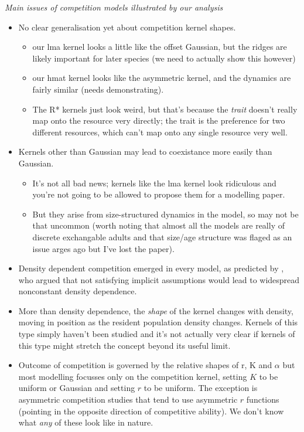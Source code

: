 \documentclass[a4paper,11pt]{article}
\begin{document}
\textit{Main issues of competition models illustrated by our analysis}
\begin{itemize}
\item No clear generalisation yet about competition kernel shapes.
  \begin{itemize}
  \item our lma kernel looks a little like the
    \citet{Roughgarden-1979} offset Gaussian, but the ridges are
    likely important for later species (we need to actually show this
    however)
  \item our hmat kernel looks like the \citet{Kisdi-1999} asymmetric
    kernel, and the dynamics are fairly similar (needs
    demonstrating).
  \item The R* kernels just look weird, but that's because the
    \emph{trait} doesn't really map onto the resource very directly;
    the trait is the preference for two different resources, which
    can't map onto any single resource very well.
  \end{itemize}
\item Kernels other than Gaussian may lead to coexistance more easily
  than Gaussian.  
  \begin{itemize}
  \item It's not all bad news; kernels like the lma kernel look
    ridiculous and you're not going to be allowed to propose them for
    a modelling paper.
  \item But they arise from size-structured dynamics in the model, so
    may not be that uncommon (worth noting that almost all the models
    are really of discrete exchangable adults and that size/age
    structure was flaged as an issue arges ago but I've lost the
    paper).
  \end{itemize}
\item Density dependent competition emerged in every model, as
  predicted by \citet{Abrams-1980}, who argued that not satisfying
  implicit assumptions would lead to widespread nonconstant density
  dependence.
\item More than density dependence, the \emph{shape} of the kernel
  changes with density, moving in position as the resident population
  density changes.  Kernels of this type simply haven't been studied
  and it's not actually very clear if kernels of this type might
  stretch the concept beyond its useful limit.
\item Outcome of competition is governed by the relative shapes of r,
  K and $\alpha$ but most modelling focusses only on the competition
  kernel, setting $K$ to be uniform or Gaussian and setting $r$ to be
  uniform.  The exception is asymmetric competition studies that tend
  to use asymmetric $r$ functions (pointing in the opposite direction
  of competitive ability). We don't know what \emph{any} of these look
  like in nature.
\end{itemize}
\end{document}
